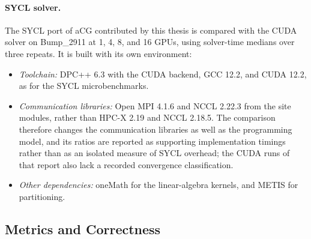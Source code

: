 \paragraph{SYCL solver.} The SYCL port of aCG contributed by this thesis \cite{merenda_acg_sycl_2026} is compared with the CUDA solver on Bump\_2911 at 1, 4, 8, and 16 GPUs, using solver-time medians over three repeats. It is built with its own environment:
\begin{itemize}
    \item \emph{Toolchain:} DPC++ 6.3 with the CUDA backend, GCC 12.2, and CUDA 12.2, as for the SYCL microbenchmarks.
    \item \emph{Communication libraries:} Open MPI 4.1.6 and NCCL 2.22.3 from the site modules, rather than HPC-X 2.19 and NCCL 2.18.5. The comparison therefore changes the communication libraries as well as the programming model, and its ratios are reported as supporting implementation timings rather than as an isolated measure of SYCL overhead; the CUDA runs of that report also lack a recorded convergence classification.
    \item \emph{Other dependencies:} oneMath for the linear-algebra kernels, and METIS for partitioning.
\end{itemize}

\subsection{Metrics and Correctness}

